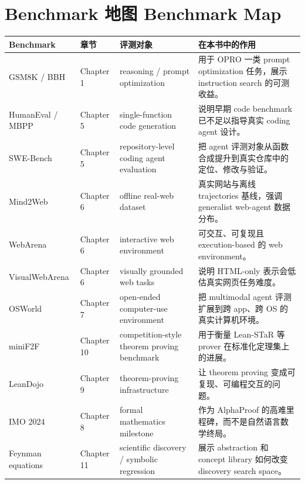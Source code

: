 \chapter{Benchmark 地图 Benchmark Map}
\small
\begin{longtable}{p{}p{}p{}p{}}
\toprule
Benchmark & 章节 & 评测对象 & 在本书中的作用 \\
\midrule
\endhead
GSM8K / BBH & Chapter 1 & reasoning / prompt optimization & 用于 OPRO 一类 prompt optimization 任务，展示 instruction search 的可测收益。 \\
HumanEval / MBPP & Chapter 5 & single-function code generation & 说明早期 code benchmark 已不足以指导真实 coding agent 设计。 \\
SWE-Bench & Chapter 5 & repository-level coding agent evaluation & 把 agent 评测对象从函数合成提升到真实仓库中的定位、修改与验证。 \\
Mind2Web & Chapter 6 & offline real-web dataset & 真实网站与离线 trajectories 基线，强调 generalist web-agent 数据分布。 \\
WebArena & Chapter 6 & interactive web environment & 可交互、可复现且 execution-based 的 web environment。 \\
VisualWebArena & Chapter 6 & visually grounded web tasks & 说明 HTML-only 表示会低估真实网页任务难度。 \\
OSWorld & Chapter 7 & open-ended computer-use environment & 把 multimodal agent 评测扩展到跨 app、跨 OS 的真实计算机环境。 \\
miniF2F & Chapter 10 & competition-style theorem proving benchmark & 用于衡量 Lean-STaR 等 prover 在标准化定理集上的进展。 \\
LeanDojo & Chapter 9 & theorem-proving infrastructure & 让 theorem proving 变成可复现、可编程交互的问题。 \\
IMO 2024 & Chapter 8 & formal mathematics milestone & 作为 AlphaProof 的高难里程碑，而不是自然语言数学终局。 \\
Feynman equations & Chapter 11 & scientific discovery / symbolic regression & 展示 abstraction 和 concept library 如何改变 discovery search space。 \\
\bottomrule
\end{longtable}
\normalsize

